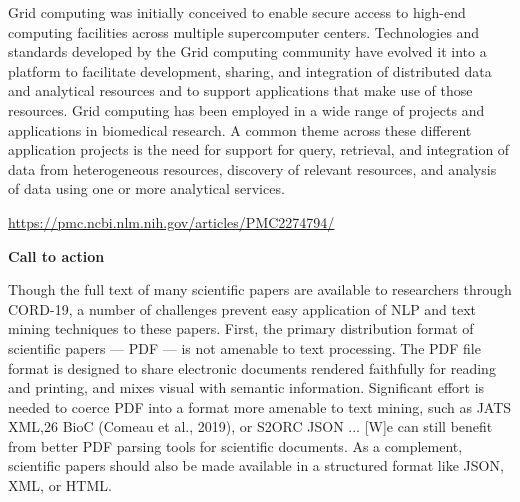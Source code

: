 \documentclass[11pt]{article}
\begin{document}
{\begin{blockQuote}
Grid computing was initially conceived to enable secure access to high-end computing facilities across multiple supercomputer centers.   Technologies and standards developed by the Grid computing community have evolved it into a platform to facilitate development, sharing, and integration of distributed data and analytical resources and to support applications that make use of those resources. Grid computing has been employed in a wide range of projects and applications in biomedical research. A common theme across these different application projects is the need for support for query, retrieval, and integration of data from heterogeneous resources, discovery of relevant resources, and analysis of data using one or more analytical services. 
\end{blockQuote}

\vspace{6pt}
\hfill{}

\hfill\href{https://pmc.ncbi.nlm.nih.gov/articles/PMC2274794/}{https://pmc.ncbi.nlm.nih.gov/articles/PMC2274794/}

\vspace*{6pt}


\begin{blockQuote}

\textbf{Call to action}

\vspace*{4pt}

Though the full text of many scientific papers are
available to researchers through CORD-19, a number of 
challenges prevent easy application of NLP
and text mining techniques to these papers. First,
the primary distribution format of scientific papers
--- PDF --- is not amenable to text processing. The
PDF file format is designed to share electronic documents rendered faithfully for reading and printing, and mixes visual with semantic information.
Significant effort is needed to coerce PDF into a
format more amenable to text mining, such as JATS
XML,26 BioC (Comeau et al., 2019), or S2ORC
JSON ... [W]e can still benefit from better PDF parsing tools
for scientific documents. As a complement, 
scientific papers should also be made available in a
structured format like JSON, XML, or HTML.
\end{blockQuote}

\vspace{-4pt}
\hfill{}

}
\end{document}
